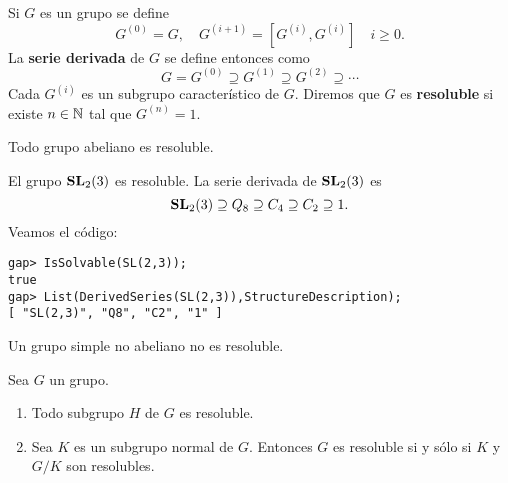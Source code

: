 Si $G$ es un grupo se define 
\[
		G^{(0)}=G,\quad
		G^{(i+1)}=[G^{(i)},G^{(i)}]\quad i\geq0.
\]
La \textbf{serie derivada} de $G$ se define entonces como
\[
G=G^{(0)}\supseteq G^{(1)}\supseteq G^{(2)}\supseteq\cdots
\]
Cada $G^{(i)}$ es un subgrupo característico de $G$. Diremos que
$G$ es \textbf{resoluble} si existe $n\in\mathbb{N}$ tal que $G^{(n)}=1$. 


\begin{example}
	Todo grupo abeliano es resoluble.
\end{example}

\begin{example}
	El grupo $\mathbf{SL}_2(3)$ es resoluble. La serie derivada de $\mathbf{SL}_2(3)$ es
	\[
	\mathbf{SL}_2(3)\supseteq Q_8\supseteq C_4\supseteq C_2\supseteq 1.
	\]
	Veamos el código:
\begin{lstlisting}
gap> IsSolvable(SL(2,3));
true
gap> List(DerivedSeries(SL(2,3)),StructureDescription);
[ "SL(2,3)", "Q8", "C2", "1" ]
\end{lstlisting}
\end{example}

\begin{example}
	Un grupo simple no abeliano no es resoluble. 
\end{example}

\begin{theorem}
	\label{theorem:resoluble}
	Sea $G$ un grupo. 
	\begin{enumerate}
		\item Todo subgrupo $H$ de $G$ es resoluble. 
		\item Sea $K$ es un subgrupo normal de $G$. Entonces $G$ es resoluble
			si y sólo si $K$ y $G/K$ son resolubles.
	\end{enumerate}
\end{theorem}

